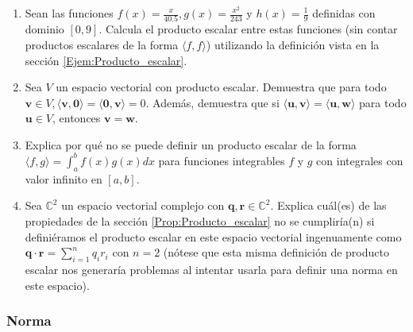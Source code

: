 \begin{enumerate}
    \item Sean las funciones $f(x)=\frac{x}{40.5}, g(x)=\frac{x^2}{243}$ y $h(x)=\frac{1}{9}$ definidas con dominio $[0,9]$. Calcula el producto escalar entre estas funciones (sin contar productos escalares de la forma $\langle f , f \rangle$) utilizando la definición vista en la sección \ref{Ejem:Producto_escalar}.
    \item Sea $V$ un espacio vectorial con producto escalar. Demuestra que para todo $\mathbf{v}\in V, \langle \mathbf{v},\mathbf{0}\rangle=\langle\mathbf{0},\mathbf{v}\rangle=0.$ Además, demuestra que si $\langle\mathbf{u},\mathbf{v}\rangle=\langle \mathbf{u},\mathbf{w}\rangle$ para todo $\mathbf{u}\in V$, entonces $\mathbf{v}=\mathbf{w}.$
    \item Explica por qué no se puede definir un producto escalar de la forma $\langle f,g\rangle=\int_a^b f(x)g(x)dx$ para funciones integrables $f$ y $g$ con integrales con valor infinito en $[a,b]$. 
    \item Sea $\mathbb{C}^2$ un espacio vectorial complejo con $\mathbf{q},\mathbf{r}\in\mathbb{C}^2$. Explica cuál(es) de las propiedades de la sección \ref{Prop:Producto_escalar} no se cumpliría(n) si definiéramos el producto escalar en este espacio vectorial ingenuamente como $\mathbf{q}\cdot\mathbf{r}=\sum_{i=1}^n q_ir_i$  con $n=2$ (nótese que esta misma definición de producto escalar nos generaría problemas al intentar usarla para definir una norma en este espacio). 
\end{enumerate}

\subsubsection{Norma} \label{Ejer:Norma}

